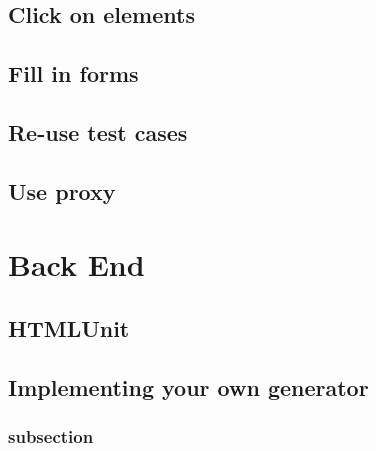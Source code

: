 \documentclass[a4paper,11pt]{kth-mag}
\begin{document}


\section{Click on elements}


\section{Fill in forms}








\section{Re-use test cases}

\section{Use proxy}

\chapter{Back End}

\section{HTMLUnit}


\section{Implementing your own generator}
\label{backendimpl}

\subsection{subsection}
\end{document}
